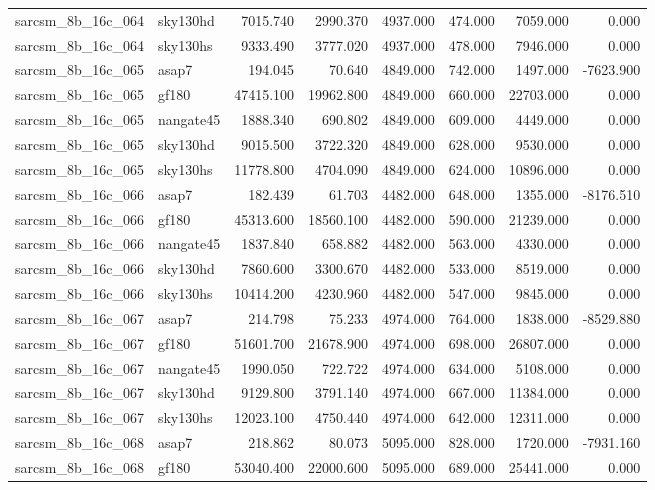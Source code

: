 \begin{tabular}{llrrrrrr}
sarcsm\_8b\_16c\_064 & sky130hd & 7015.740 & 2990.370 & 4937.000 & 474.000 & 7059.000 & 0.000 \\
sarcsm\_8b\_16c\_064 & sky130hs & 9333.490 & 3777.020 & 4937.000 & 478.000 & 7946.000 & 0.000 \\
sarcsm\_8b\_16c\_065 & asap7 & 194.045 & 70.640 & 4849.000 & 742.000 & 1497.000 & -7623.900 \\
sarcsm\_8b\_16c\_065 & gf180 & 47415.100 & 19962.800 & 4849.000 & 660.000 & 22703.000 & 0.000 \\
sarcsm\_8b\_16c\_065 & nangate45 & 1888.340 & 690.802 & 4849.000 & 609.000 & 4449.000 & 0.000 \\
sarcsm\_8b\_16c\_065 & sky130hd & 9015.500 & 3722.320 & 4849.000 & 628.000 & 9530.000 & 0.000 \\
sarcsm\_8b\_16c\_065 & sky130hs & 11778.800 & 4704.090 & 4849.000 & 624.000 & 10896.000 & 0.000 \\
sarcsm\_8b\_16c\_066 & asap7 & 182.439 & 61.703 & 4482.000 & 648.000 & 1355.000 & -8176.510 \\
sarcsm\_8b\_16c\_066 & gf180 & 45313.600 & 18560.100 & 4482.000 & 590.000 & 21239.000 & 0.000 \\
sarcsm\_8b\_16c\_066 & nangate45 & 1837.840 & 658.882 & 4482.000 & 563.000 & 4330.000 & 0.000 \\
sarcsm\_8b\_16c\_066 & sky130hd & 7860.600 & 3300.670 & 4482.000 & 533.000 & 8519.000 & 0.000 \\
sarcsm\_8b\_16c\_066 & sky130hs & 10414.200 & 4230.960 & 4482.000 & 547.000 & 9845.000 & 0.000 \\
sarcsm\_8b\_16c\_067 & asap7 & 214.798 & 75.233 & 4974.000 & 764.000 & 1838.000 & -8529.880 \\
sarcsm\_8b\_16c\_067 & gf180 & 51601.700 & 21678.900 & 4974.000 & 698.000 & 26807.000 & 0.000 \\
sarcsm\_8b\_16c\_067 & nangate45 & 1990.050 & 722.722 & 4974.000 & 634.000 & 5108.000 & 0.000 \\
sarcsm\_8b\_16c\_067 & sky130hd & 9129.800 & 3791.140 & 4974.000 & 667.000 & 11384.000 & 0.000 \\
sarcsm\_8b\_16c\_067 & sky130hs & 12023.100 & 4750.440 & 4974.000 & 642.000 & 12311.000 & 0.000 \\
sarcsm\_8b\_16c\_068 & asap7 & 218.862 & 80.073 & 5095.000 & 828.000 & 1720.000 & -7931.160 \\
sarcsm\_8b\_16c\_068 & gf180 & 53040.400 & 22000.600 & 5095.000 & 689.000 & 25441.000 & 0.000 \\

\end{tabular}
